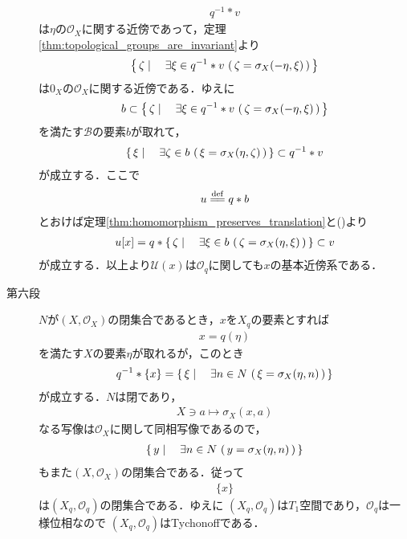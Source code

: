 \begin{sketch}
\begin{description}
				\begin{align}
					q^{-1} \ast v
				\end{align}
				は$\eta$の$\mathscr{O}_X$に関する近傍であって，定理\ref{thm:topological_groups_are_invariant}より
				\begin{align}
					\left\{\, \zeta \mid \quad \exists \xi \in q^{-1} \ast v\, \left(\, \zeta = \sigma_X(-\eta,\xi)\, \right)\, \right\}
				\end{align}
				は$0_X$の$\mathscr{O}_X$に関する近傍である．ゆえに
				\begin{align}
					b \subset \left\{\, \zeta \mid \quad \exists \xi \in q^{-1} \ast v\, \left(\, \zeta = \sigma_X(-\eta,\xi)\, \right)\, \right\}
				\end{align}
				を満たす$\mathscr{B}$の要素$b$が取れて，
				\begin{align}
					\left\{\, \xi \mid \quad \exists \zeta \in b\, \left(\, \xi = \sigma_X(\eta,\zeta)\, \right)\, \right\}
					\subset q^{-1} \ast v
				\end{align}
				が成立する．ここで
				\begin{align}
					u \defeq q \ast b
				\end{align}
				とおけば定理\ref{thm:homomorphism_preserves_translation}と()より
				\begin{align}
					u[x] = q \ast \left\{\, \zeta \mid \quad \exists \xi \in b\, \left(\, \zeta = \sigma_X(\eta,\xi)\, \right)\, \right\}
					\subset v
				\end{align}
				が成立する．以上より$\mathscr{U}(x)$は$\mathscr{O}_q$に関しても$x$の基本近傍系である．
				
			\item[第六段]
				$N$が$(X,\mathscr{O}_X)$の閉集合であるとき，$x$を$X_q$の要素とすれば
				\begin{align}
					x = q(\eta)
				\end{align}
				を満たす$X$の要素$\eta$が取れるが，このとき
				\begin{align}
					q^{-1} \ast \{x\} = \left\{\, \xi \mid \quad \exists n \in N\, \left(\, \xi = \sigma_X(\eta,n)\, \right)\, \right\}
				\end{align}
				が成立する．$N$は閉であり，
				\begin{align}
					X \ni a \longmapsto \sigma_X(x,a)
				\end{align}
				なる写像は$\mathscr{O}_X$に関して同相写像であるので，
				\begin{align}
					\left\{\, y \mid \quad \exists n \in N\, \left(\, y = \sigma_X(\eta,n)\, \right)\, \right\}
				\end{align}
				もまた$(X,\mathscr{O}_X)$の閉集合である．従って
				\begin{align}
					\{x\}
				\end{align}
				は$(X_q,\mathscr{O}_q)$の閉集合である．ゆえに
				$(X_q,\mathscr{O}_q)$は$T_1$空間であり，$\mathscr{O}_q$は一様位相なので
				$(X_q,\mathscr{O}_q)$はTychonoffである．
				\QED
		\end{description}
	\end{sketch}
	
